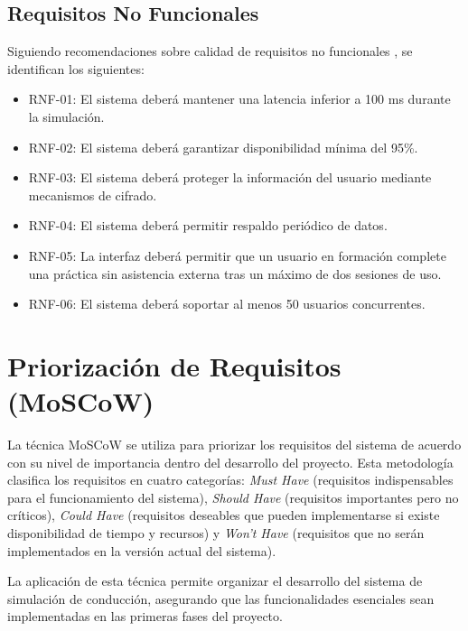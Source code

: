 \documentclass[12pt]{article}
\begin{document}
	\subsection{Requisitos No Funcionales}
	
	Siguiendo recomendaciones sobre calidad de requisitos no funcionales \cite{Dongmo202523790,Khalid2025}, se identifican los siguientes:
	
	\begin{itemize}
		\item RNF-01: El sistema deberá mantener una latencia inferior a 100 ms durante la simulación.
		
		\item RNF-02: El sistema deberá garantizar disponibilidad mínima del 95\%.
		
		\item RNF-03: El sistema deberá proteger la información del usuario mediante mecanismos de cifrado.
		
		\item RNF-04: El sistema deberá permitir respaldo periódico de datos.
		
		\item RNF-05: La interfaz deberá permitir que un usuario en formación complete una práctica sin asistencia externa tras un máximo de dos sesiones de uso.
		
		\item RNF-06: El sistema deberá soportar al menos 50 usuarios concurrentes.
	\end{itemize}
    \section{Priorización de Requisitos (MoSCoW)}

La técnica MoSCoW se utiliza para priorizar los requisitos del sistema de acuerdo con su nivel de importancia dentro del desarrollo del proyecto. Esta metodología clasifica los requisitos en cuatro categorías: \textit{Must Have} (requisitos indispensables para el funcionamiento del sistema), \textit{Should Have} (requisitos importantes pero no críticos), \textit{Could Have} (requisitos deseables que pueden implementarse si existe disponibilidad de tiempo y recursos) y \textit{Won't Have} (requisitos que no serán implementados en la versión actual del sistema).

La aplicación de esta técnica permite organizar el desarrollo del sistema de simulación de conducción, asegurando que las funcionalidades esenciales sean implementadas en las primeras fases del proyecto.
\end{document}
